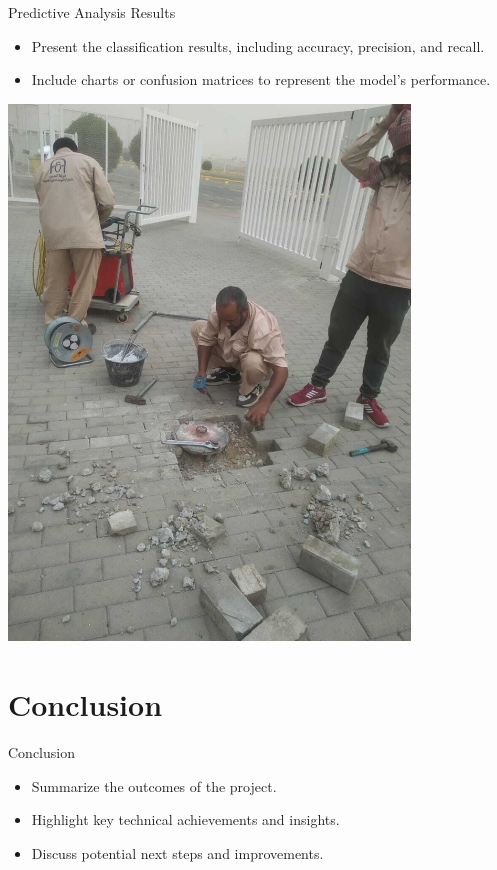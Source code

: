 \documentclass{beamer}
\begin{document}
\begin{frame}{Predictive Analysis Results}
    \begin{itemize}
        \item Present the classification results, including accuracy, precision, and recall.
        \item Include charts or confusion matrices to represent the model's performance.
    \end{itemize}
    \includegraphics[width=0.8\textwidth]{images/predictive_results.jpg}
\end{frame}

\section{Conclusion}
\begin{frame}{Conclusion}
    \begin{itemize}
        \item Summarize the outcomes of the project.
        \item Highlight key technical achievements and insights.
        \item Discuss potential next steps and improvements.
    \end{itemize}
\end{frame}
\end{document}
